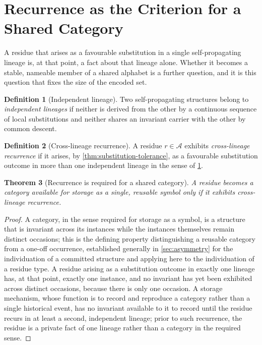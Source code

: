 \documentclass[11pt,twocolumn,a4paper]{article}
\theoremstyle{plain}
\newtheorem{theorem}{Theorem}[section]
\theoremstyle{definition}
\newtheorem{definition}[theorem]{Definition}
\theoremstyle{remark}
\newcommand{\Resset}{\mathcal{A}}
\begin{document}
\section{Recurrence as the Criterion for a Shared Category}
\label{sec:recurrence}

A residue that arises as a favourable substitution in a single
self-propagating lineage is, at that point, a fact about that lineage
alone. Whether it becomes a stable, nameable member of a shared alphabet is
a further question, and it is this question that fixes the size of the
encoded set.

\begin{definition}[Independent lineage]
\label{def:lineage}
Two self-propagating structures belong to \emph{independent lineages} if
neither is derived from the other by a continuous sequence of local
substitutions and neither shares an invariant carrier with the other by
common descent.
\end{definition}

\begin{definition}[Cross-lineage recurrence]
\label{def:crossrecurrence}
A residue $r \in \Resset$ exhibits \emph{cross-lineage recurrence} if it
arises, by \cref{thm:substitution-tolerance}, as a favourable substitution
outcome in more than one independent lineage in the sense of
\cref{def:lineage}.
\end{definition}

\begin{theorem}[Recurrence is required for a shared category]
\label{thm:recurrence-required}
A residue becomes a category available for storage as a single, reusable
symbol only if it exhibits cross-lineage recurrence.
\end{theorem}

\begin{proof}
A category, in the sense required for storage as a symbol, is a structure
that is invariant across its instances while the instances themselves
remain distinct occasions; this is the defining property distinguishing a
reusable category from a one-off occurrence, established generally in
\cref{sec:asymmetry} for the individuation of a committed structure and
applying here to the individuation of a residue type. A residue arising as
a substitution outcome in exactly one lineage has, at that point, exactly
one instance, and no invariant has yet been exhibited across distinct
occasions, because there is only one occasion. A storage mechanism, whose
function is to record and reproduce a category rather than a single
historical event, has no invariant available to it to record until the
residue recurs in at least a second, independent lineage; prior to such
recurrence, the residue is a private fact of one lineage rather than a
category in the required sense.
\end{proof}
\end{document}
